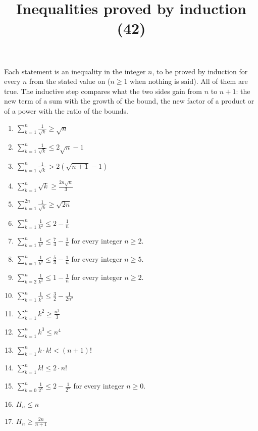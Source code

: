 \documentclass[11pt,a4paper]{article}
\title{Inequalities proved by induction (42)}
\author{}
\date{}
\begin{document}
\maketitle
Each statement is an inequality in the integer $n$, to be proved by induction for every $n$ from the stated value on ($n \ge 1$ when nothing is said). All of them are true. The inductive step compares what the two sides gain from $n$ to $n + 1$: the new term of a sum with the growth of the bound, the new factor of a product or of a power with the ratio of the bounds.

\begin{enumerate}
\item $\displaystyle \sum_{k=1}^{n} \frac{1}{\sqrt{k}} \ge \sqrt{n}$
\item $\displaystyle \sum_{k=1}^{n} \frac{1}{\sqrt{k}} \le 2\sqrt{n} - 1$
\item $\displaystyle \sum_{k=1}^{n} \frac{1}{\sqrt{k}} > 2\left(\sqrt{n + 1} - 1\right)$
\item $\displaystyle \sum_{k=1}^{n} \sqrt{k} \ge \frac{2n\sqrt{n}}{3}$
\item $\displaystyle \sum_{k=1}^{2n} \frac{1}{\sqrt{k}} \ge \sqrt{2n}$
\item $\displaystyle \sum_{k=1}^{n} \frac{1}{k^{2}} \le 2 - \frac{1}{n}$
\item $\displaystyle \sum_{k=1}^{n} \frac{1}{k^{2}} \le \frac{7}{4} - \frac{1}{n}$ for every integer $n\ge 2$.
\item $\displaystyle \sum_{k=1}^{n} \frac{1}{k^{2}} \le \frac{5}{3} - \frac{1}{n}$ for every integer $n\ge 5$.
\item $\displaystyle \sum_{k=2}^{n} \frac{1}{k^{2}} \le 1 - \frac{1}{n}$ for every integer $n\ge 2$.
\item $\displaystyle \sum_{k=1}^{n} \frac{1}{k^{3}} \le \frac{3}{2} - \frac{1}{2n^{2}}$
\item $\displaystyle \sum_{k=1}^{n} k^{2} \ge \frac{n^{3}}{3}$
\item $\displaystyle \sum_{k=1}^{n} k^{3} \le n^{4}$
\item $\displaystyle \sum_{k=1}^{n} k \cdot k! < \left(n + 1\right)!$
\item $\displaystyle \sum_{k=1}^{n} k! \le 2 \cdot n!$
\item $\displaystyle \sum_{k=0}^{n} \frac{1}{2^{k}} \le 2 - \frac{1}{2^{n}}$ for every integer $n\ge 0$.
\item $\displaystyle H_{n} \le n$
\item $\displaystyle H_{n} \ge \frac{2n}{n + 1}$

\end{enumerate}
\end{document}
